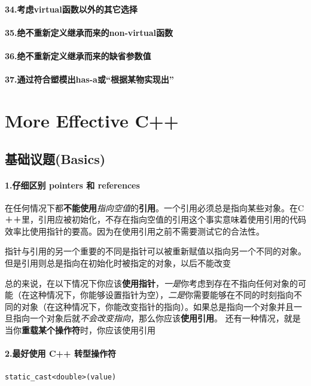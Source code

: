 \documentclass[UTF8,a4paper,12pt]{ctexbook}
\begin{document}
		\paragraph{34.考虑virtual函数以外的其它选择}
		\paragraph{35.绝不重新定义继承而来的non-virtual函数}
		\paragraph{36.绝不重新定义继承而来的缺省参数值}
		\paragraph{37.通过符合塑模出has-a或“根据某物实现出”}
	\section{More Effective C++}
		\subsection{基础议题(Basics)}
			\paragraph{1.仔细区别 pointers 和 references}
				在任何情况下都\textbf{不能使用}\textit{指向空值}的\textbf{引用}。一个引用必须总是指向某些对象。在C＋＋里，引用应被初始化，不存在指向空值的引用这个事实意味着使用引用的代码效率比使用指针的要高。因为在使用引用之前不需要测试它的合法性。
				
				指针与引用的另一个重要的不同是指针可以被重新赋值以指向另一个不同的对象。但是引用则总是指向在初始化时被指定的对象，以后不能改变
				
				总的来说，在以下情况下你应该\textbf{使用指针}，\textit{一是}你考虑到存在不指向任何对象的可能（在这种情况下，你能够设置指针为空），\textit{二是}你需要能够在不同的时刻指向不同的对象（在这种情况下，你能改变指针的指向）。如果总是指向一个对象并且一旦指向一个对象后就\textit{不会改变指向}，那么你应该\textbf{使用引用}。
				还有一种情况，就是当你\textbf{重载某个操作符}时，你应该使用引用
			\paragraph{2.最好使用 C++ 转型操作符}
				\verb|static_cast<double>(value)|
				
\end{document}
